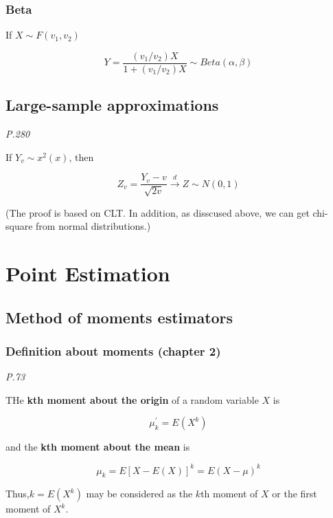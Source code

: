 \documentclass[]{book}
\begin{document}
\hypertarget{beta}{%
\subsubsection{Beta}\label{beta}}

If \(X \sim F(v_1, v_2)\)

\[Y=\frac{(v_1/v_2)X}{1+(v_1/v_2)X} \sim Beta(\alpha, \beta)\]

\hypertarget{large-sample-approximations}{%
\subsection{Large-sample approximations}\label{large-sample-approximations}}

\emph{P.280}

If \(Y_v \sim x^2(x)\), then

\[Z_v =\frac{Y_v-v}{\sqrt{2v}} \xrightarrow{d} Z \sim N(0,1)\]

(The proof is based on CLT. In addition, as disscused above, we can get chi-square from normal distributions.)

\hypertarget{point-estimation}{%
\section{Point Estimation}\label{point-estimation}}

\hypertarget{method-of-moments-estimators}{%
\subsection{Method of moments estimators}\label{method-of-moments-estimators}}

\hypertarget{definition-about-moments-chapter-2}{%
\subsubsection{Definition about moments (chapter 2)}\label{definition-about-moments-chapter-2}}

\emph{P.73}

THe \textbf{kth moment about the origin} of a random variable \(X\) is

\[\mu^{'}_k=E(X^k)\]

and the \textbf{kth moment about the mean} is

\[\mu_k=E[X-E(X)]^k=E(X-\mu)^k\]

Thus,\(k=E(X^k)\) may be considered as the \(k\)th moment of \(X\) or the first moment of \(X^k\).
\end{document}
